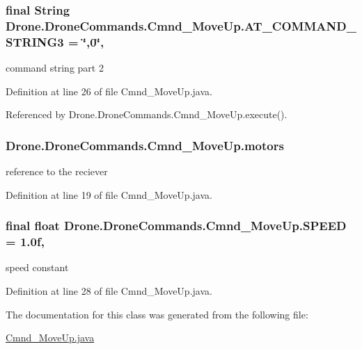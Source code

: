 \subsubsection[{A\+T\+\_\+\+C\+O\+M\+M\+A\+N\+D\+\_\+\+S\+T\+R\+I\+N\+G3}]{\setlength{\rightskip}{0pt plus 5cm}final String Drone.\+Drone\+Commands.\+Cmnd\+\_\+\+Move\+Up.\+A\+T\+\_\+\+C\+O\+M\+M\+A\+N\+D\+\_\+\+S\+T\+R\+I\+N\+G3 = \char`\"{},0\char`\"{}\hspace{0.3cm}{\ttfamily [static]}, {\ttfamily [private]}}\label{class_drone_1_1_drone_commands_1_1_cmnd___move_up_ae04f16b0fcbe1ba267bccca616e6bef1}
command string part 2 

Definition at line 26 of file Cmnd\+\_\+\+Move\+Up.\+java.



Referenced by Drone.\+Drone\+Commands.\+Cmnd\+\_\+\+Move\+Up.\+execute().

\hypertarget{class_drone_1_1_drone_commands_1_1_cmnd___move_up_aaef759c5762f10ff3de1072e24ce1b71}{}
\subsubsection[{motors}]{ Drone.\+Drone\+Commands.\+Cmnd\+\_\+\+Move\+Up.\+motors\hspace{0.3cm}{\ttfamily [private]}}\label{class_drone_1_1_drone_commands_1_1_cmnd___move_up_aaef759c5762f10ff3de1072e24ce1b71}
reference to the reciever 

Definition at line 19 of file Cmnd\+\_\+\+Move\+Up.\+java.

\hypertarget{class_drone_1_1_drone_commands_1_1_cmnd___move_up_ad13629ea9d3d529c885bb532f8eb999f}{}
\subsubsection[{S\+P\+E\+E\+D}]{\setlength{\rightskip}{0pt plus 5cm}final float Drone.\+Drone\+Commands.\+Cmnd\+\_\+\+Move\+Up.\+S\+P\+E\+E\+D = 1.\+0f\hspace{0.3cm}{\ttfamily [static]}, {\ttfamily [private]}}\label{class_drone_1_1_drone_commands_1_1_cmnd___move_up_ad13629ea9d3d529c885bb532f8eb999f}
speed constant 

Definition at line 28 of file Cmnd\+\_\+\+Move\+Up.\+java.



The documentation for this class was generated from the following file\+:\begin{DoxyCompactItemize}
\item 
\hyperlink{_cmnd___move_up_8java}{Cmnd\+\_\+\+Move\+Up.\+java}\end{DoxyCompactItemize}

